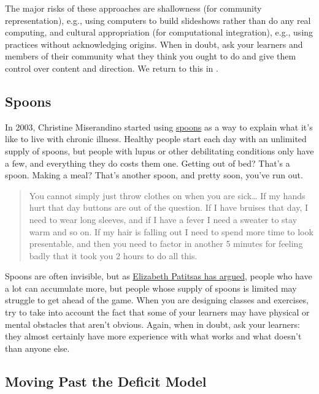 The major risks of these approaches are shallowness (for community
representation), e.g., using computers to build slideshows rather than
do any real computing, and cultural appropriation (for computational
integration), e.g., using practices without acknowledging origins.
When in doubt, ask your learners and members of their community what
they think you ought to do and give them control over content and
direction.  We return to this in .

\subsection*{Spoons}

In 2003, Christine Miserandino started using
\href{https://butyoudontlooksick.com/articles/written-by-christine/the-spoon-theory/}{spoons}
as a way to explain what it's like to live with chronic illness.
Healthy people start each day with an unlimited supply of spoons, but
people with lupus or other debilitating conditions only have a few,
and everything they do costs them one.  Getting out of bed?  That's a
spoon. Making a meal?  That's another spoon, and pretty soon, you've
run out.

\begin{quote}

  You cannot simply just throw clothes on when you are sick{\ldots} If
  my hands hurt that day buttons are out of the question. If I have
  bruises that day, I need to wear long sleeves, and if I have a fever
  I need a sweater to stay warm and so on. If my hair is falling out I
  need to spend more time to look presentable, and then you need to
  factor in another 5 minutes for feeling badly that it took you 2
  hours to do all this.

\end{quote}

Spoons are often invisible, but as
\href{https://patitsas.blogspot.com/2018/03/spoons-are-form-of-capital.html}{Elizabeth
  Patitsas has argued}, people who have a lot can accumulate more, but
people whose supply of spoons is limited may struggle to get ahead of
the game.  When you are designing classes and exercises, try to take
into account the fact that some of your learners may have physical or
mental obstacles that aren't obvious.  Again, when in doubt, ask your
learners: they almost certainly have more experience with what works
and what doesn't than anyone else.

\subsection*{Moving Past the Deficit Model}\label{s:motivation-deficit}

